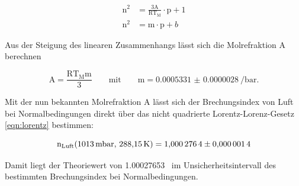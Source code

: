         \FloatBarrier

        \begin{align}
            \text{n}^2 &= \frac{3\text{A}}{\text{RT}_{\text{M}}} \cdot \text{p} + 1 \\
            \text{n}^2 &= \text{m} \cdot \text{p} + b
        \end{align}

        Aus der Steigung des linearen Zusammenhangs lässt sich die Molrefraktion A berechnen

        \begin{equation}
            \text{A} = \frac{\text{RT}_{\text{M}}\text{m}}{3} \qquad \text{mit} \qquad \text{m}=\SI{0.0005331(28)}{\per\bar}.
        \end{equation}

        Mit der nun bekannten Molrefraktion A lässt sich der Brechungsindex von Luft bei Normalbedingungen direkt über das nicht quadrierte Lorentz-Lorenz-Gesetz \eqref{eqn:lorentz} bestimmen:

        \begin{equation}
            \text{n}_{\text{Luft}}(\SI{1013}{\milli\bar}, \, \SI{288.15}{\kelvin}) = \num{1.0002764 +- 0.0000014}
        \end{equation}

        Damit liegt der Theoriewert von \num{1.00027653}~\cite{ciddor_refractive_1996} im Unsicherheitsintervall des bestimmten Brechungsindex bei Normalbedingungen.
        
